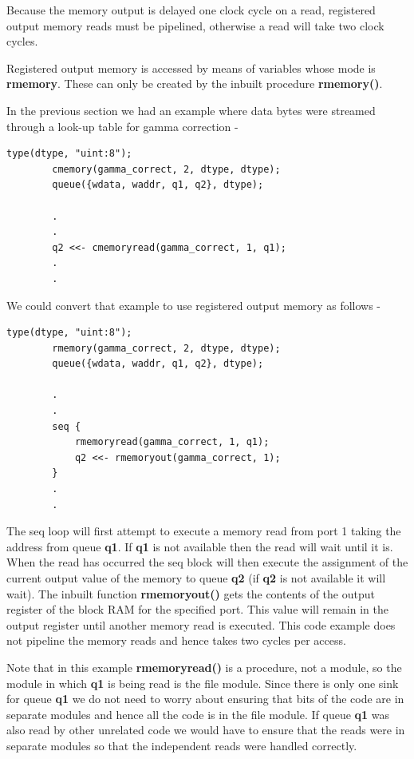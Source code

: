 \documentclass[10pt,a4paper,twoside,fleqn]{article}
\newcommand{\kwd}[1]{{\bf #1}} %
\newcommand{\var}[1]{{\bf #1}} %
\begin{document}
    Because the memory output is delayed one clock cycle on a read, registered
    output memory reads must be pipelined, otherwise a read will take two clock
    cycles.
    
    Registered output memory is accessed by means of variables whose mode
    is \kwd{rmemory}. These can only be created by the inbuilt procedure
    \kwd{rmemory()}.
    
    In the previous section we had an example where data bytes were streamed
    through a look-up table for gamma correction -
    \begin{lstlisting}[language=threepl]
        type(dtype, "uint:8");
        cmemory(gamma_correct, 2, dtype, dtype);
        queue({wdata, waddr, q1, q2}, dtype);
                
        .
        .
        q2 <<- cmemoryread(gamma_correct, 1, q1);
        .
        .
    \end{lstlisting}
    We could convert that example to use registered output memory as follows -
    \begin{lstlisting}[language=threepl]
        type(dtype, "uint:8");
        rmemory(gamma_correct, 2, dtype, dtype);
        queue({wdata, waddr, q1, q2}, dtype);
                
        .
        .
        seq {
            rmemoryread(gamma_correct, 1, q1);
            q2 <<- rmemoryout(gamma_correct, 1);
        }
        .
        .
    \end{lstlisting}
    The seq loop will first attempt to execute a memory read from port 1 taking
    the address from queue \var{q1}. If \var{q1} is not available then the read
    will wait until it is. When the read has occurred the seq block will then
    execute the assignment of the current output value of the memory to queue
    \var{q2} (if \var{q2} is not available it will wait). The inbuilt function
    \kwd{rmemoryout()} gets the contents of the output register of the block RAM
    for the specified port. This value will remain in the output register until
    another memory read is executed. This code example does not pipeline the
    memory reads and hence takes two cycles per access.
    
    Note that in this example \kwd{rmemoryread()} is a procedure, not a module,
    so the module in which \var{q1} is being read is the file module.
    Since there is only one sink for queue \var{q1} we do not need to worry
    about ensuring that bits of the code are in separate modules and hence
    all the code is in the file module. If queue \var{q1} was also
    read by other unrelated code we would have to ensure that the reads were
    in separate modules so that the independent reads were handled correctly.
    
\end{document}
